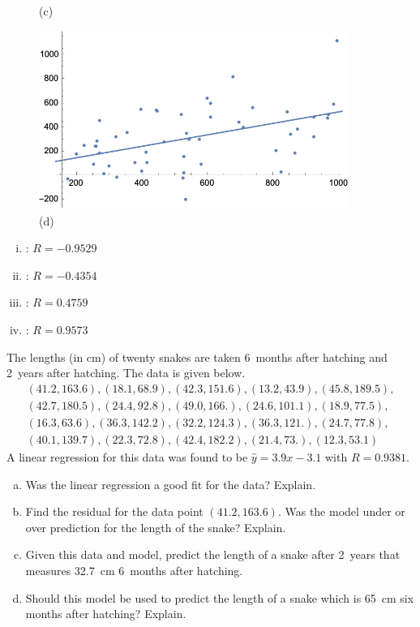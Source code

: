\documentclass[11pt,letterpaper]{article}
\begin{document}
\begin{figure}[!ht]
\begin{minipage}{0.45\textwidth}
	   \caption*{(c)}
	\end{minipage}
	\begin{minipage}{0.45\textwidth}
	   \centering
	   \includegraphics[width=0.9\textwidth]{reg4.png}
	   \caption*{(d)}
	\end{minipage}
	\end{figure}

\begin{enumerate}[(i)]
\item {}: $R= -0.9529$
\item {}: $R= -0.4354$
\item {}: $R= 0.4759$
\item{}: $R= 0.9573$
\end{enumerate} 





\newpage





 The lengths (in cm) of twenty snakes are taken 6~months after hatching and 2~years after hatching. The data is given below.
	\[
	\begin{aligned}
	(41.2, 163.6), (18.1, 68.9), (42.3, 151.6), (13.2, 43.9), (45.8, 189.5), \\ 
	(42.7, 180.5), (24.4, 92.8), (49.0, 166.), (24.6, 101.1), (18.9, 77.5), \\
	(16.3, 63.6), (36.3, 142.2), (32.2, 124.3), (36.3, 121.), (24.7, 77.8), \\
	(40.1, 139.7), (22.3, 72.8), (42.4, 182.2), (21.4, 73.), (12.3, 53.1)
	\end{aligned}
	\]
A linear regression for this data was found to be $\widehat{y}= 3.9x - 3.1$ with $R= 0.9381$. 
	\begin{enumerate}[(a)]
	\item Was the linear regression a good fit for the data? Explain.
	\item Find the residual for the data point $(41.2, 163.6)$. Was the model under or over prediction for the length of the snake? Explain.
	\item Given this data and model, predict the length of a snake after 2~years that measures 32.7~cm 6~months after hatching. 
	\item Should this model be used to predict the length of a snake which is 65~cm six months after hatching? Explain. 
	\end{enumerate} \pspace
\end{document}
